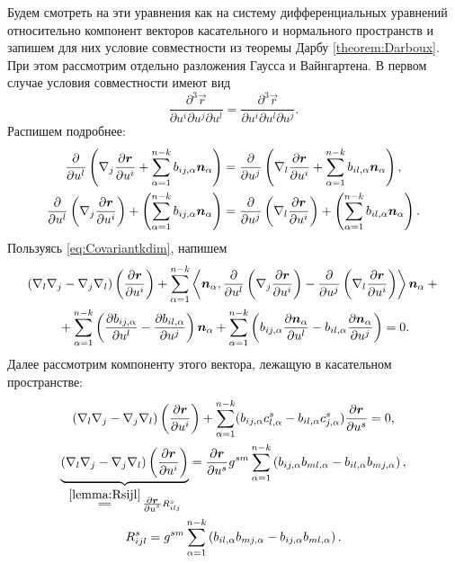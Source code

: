 Будем смотреть на эти уравнения как на систему дифференциальных уравнений относительно компонент векторов касательного и нормального пространств и запишем для них условие совместности из теоремы Дарбу \ref{theorem:Darboux}. При этом рассмотрим отдельно разложения Гаусса и Вайнгартена. В первом случае условия совместности имеют вид
\[
	\frac{\partial^3\vec{r}}{\partial u^i\partial u^j\partial u^l} = \frac{\partial^3\vec{r}}{\partial u^i\partial u^l\partial u^j}.
\]
Распишем подробнее:
\begin{gather*}
	\frac{\partial}{\partial u^l}\left(\nabla_j\frac{\partial\boldsymbol{r}}{\partial u^i} + \sum_{\alpha = 1}^{n - k}b_{ij, \alpha}\boldsymbol{n}_\alpha\right) = \frac{\partial}{\partial u^j}\left(\nabla_l\frac{\partial\boldsymbol{r}}{\partial u^i} + \sum_{\alpha = 1}^{n - k}b_{il, \alpha}\boldsymbol{n}_\alpha\right),\\
	\frac{\partial}{\partial u^l}\left(\nabla_j\frac{\partial\boldsymbol{r}}{\partial u^i}\right) + \left(\sum_{\alpha = 1}^{n - k}b_{ij, \alpha}\boldsymbol{n}_\alpha\right) = \frac{\partial}{\partial u^j}\left(\nabla_l\frac{\partial\boldsymbol{r}}{\partial u^i}\right) + \left(\sum_{\alpha = 1}^{n - k}b_{il, \alpha}\boldsymbol{n}_\alpha\right).
\end{gather*}
Пользуясь \eqref{eq:Covariantkdim}, напишем
\begin{multline} \label{eq:GaussCodazzikdim}
	(\nabla_l\nabla_j - \nabla_j\nabla_l)\left(\frac{\partial\boldsymbol{r}}{\partial u^i}\right) + \sum_{\alpha = 1}^{n - k}\left\langle\boldsymbol{n}_\alpha, \frac{\partial}{\partial u^l}\left(\nabla_j\frac{\partial\boldsymbol{r}}{\partial u^i}\right) - \frac{\partial}{\partial u^j}\left(\nabla_l\frac{\partial\boldsymbol{r}}{\partial u^i}\right)\right\rangle\boldsymbol{n}_\alpha + {}\\{} + \sum_{\alpha = 1}^{n - k}\left(\frac{\partial b_{ij, \alpha}}{\partial u^l} - \frac{\partial b_{il, \alpha}}{\partial u^j}\right)\boldsymbol{n}_\alpha + \sum_{\alpha = 1}^{n - k}\left(b_{ij, \alpha}\frac{\partial\boldsymbol{n}_\alpha}{\partial u^l} - b_{il, \alpha}\frac{\partial\boldsymbol{n}_\alpha}{\partial u^j}\right) = 0.
\end{multline}
Далее рассмотрим компоненту этого вектора, лежащую в касательном пространстве:
\begin{gather*}
	(\nabla_l\nabla_j - \nabla_j\nabla_l)\br{\frac{\partial\vec{r}}{\partial u^i}} + \sum_{\alpha = 1}^{n - k}(b_{ij, \alpha}c^s_{l, \alpha} - b_{il, \alpha}c^s_{j, \alpha})\frac{\partial\vec{r}}{\partial u^s} = 0,\\
	{\underbrace{(\nabla_l\nabla_j - \nabla_j\nabla_l)\br{\frac{\partial\vec{r}}{\partial u^i}}}_{\stackrel{\ref{lemma:Rsijl}}{=\joinrel=}\,\frac{\scriptstyle\partial\vec{r}}{\scriptstyle\partial u^s}R^s_{ilj}}} = \frac{\partial\vec{r}}{\partial u^s}g^{sm}\sum_{\alpha = 1}^{n - k}\br{b_{ij, \alpha}b_{ml, \alpha} - b_{il, \alpha}b_{mj, \alpha}},\\
	R^s_{ijl} = g^{sm}\sum_{\alpha = 1}^{n - k}\br{b_{il, \alpha}b_{mj, \alpha} - b_{ij, \alpha}b_{ml, \alpha}}.
\end{gather*}
